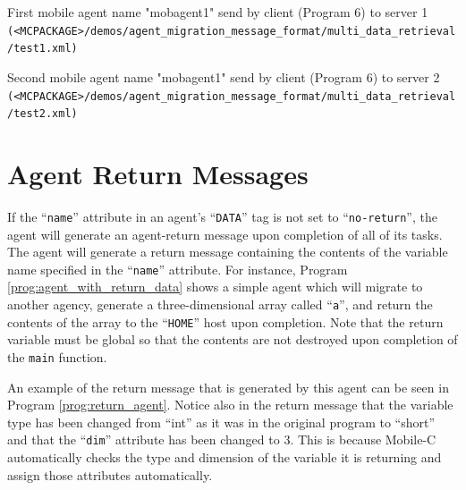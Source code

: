 \documentclass[11pt]{report}
\begin{document}
\begin{Program}[p]
\begin{center}
   {\footnotesize \linespread{1.0}
     }
\end{center}\caption{First mobile agent name "mobagent1" send by client (Program 6) to server 1   
  \texttt{(<MCPACKAGE>/demos/agent\_migration\_message\_format/multi\_data\_retrieval/test1.xml)}}
\label{prog:mobile_agent_1}
\end{Program}

\begin{Program}[p]
\begin{center}
   {\footnotesize \linespread{1.0}
     }
\end{center}\caption{Second mobile agent name "mobagent1" send by client (Program 6) to server 2
  \texttt{(<MCPACKAGE>/demos/agent\_migration\_message\_format/multi\_data\_retrieval/test2.xml)}}
\label{prog:mobile_agent_2}
\end{Program}

\section{Agent Return Messages}
If the ``\texttt{name}'' attribute in an agent's ``\texttt{DATA}'' tag
is not set to ``\texttt{no-return}'', the agent will generate an
agent-return message upon completion of all of its tasks. The agent will
generate a return message containing the contents of the variable name
specified in the ``\texttt{name}'' attribute. For instance, Program
\vref{prog:agent_with_return_data} shows a simple agent which 
will migrate to another agency, generate a three-dimensional array called
``\texttt{a}'', and return the contents of the array to the ``\texttt{HOME}''
host upon completion. Note that the return variable must be global
so that the contents are not destroyed upon completion of the \texttt{main}
function. 
  
  An example of the return message that is generated by
this agent can be seen in Program \vref{prog:return_agent}. Notice also in
the return message that the variable type has been changed from ``int'' as it
was in the original program to ``short'' and that the ``\texttt{dim}'' attribute
has been changed to $3$. This is because Mobile-C automatically
checks the type and dimension of the variable it is returning and assign
those attributes automatically.
\end{document}
